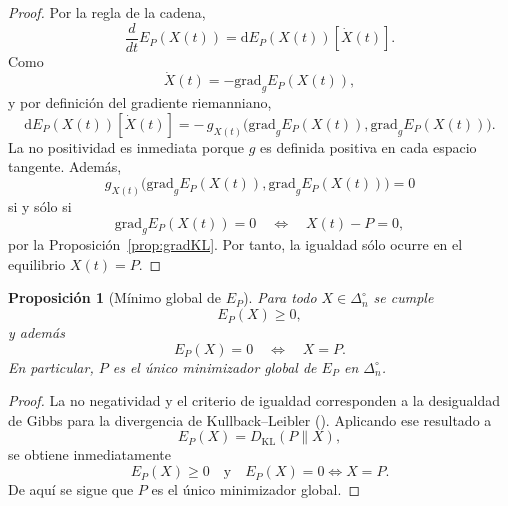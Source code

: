 \documentclass[12pt]{article}
\newtheorem{proposicion}{Proposición}[section]
\begin{document}
\begin{proof}
Por la regla de la cadena,
\[
\frac{d}{dt}E_P(X(t))
=
\mathrm dE_P(X(t))[\dot X(t)].
\]
Como
\[
\dot X(t)=-\mathrm{grad}_gE_P(X(t)),
\]
y por definición del gradiente riemanniano,
\[
\mathrm dE_P(X(t))[\dot X(t)]
=
-\,g_{X(t)}\!\bigl(\mathrm{grad}_gE_P(X(t)),\mathrm{grad}_gE_P(X(t))\bigr).
\]
La no positividad es inmediata porque $g$ es definida positiva en cada espacio tangente. Además,
\[
g_{X(t)}\!\bigl(\mathrm{grad}_gE_P(X(t)),\mathrm{grad}_gE_P(X(t))\bigr)=0
\]
si y sólo si
\[
\mathrm{grad}_gE_P(X(t))=0
\quad\Longleftrightarrow\quad
X(t)-P=0,
\]
por la Proposición~\ref{prop:gradKL}. Por tanto, la igualdad sólo ocurre en el equilibrio $X(t)=P$.
\end{proof}

\begin{proposicion}[Mínimo global de $E_P$]\label{prop:minimoGlobalKL}
Para todo $X\in\Delta_n^\circ$ se cumple
\[
E_P(X)\ge 0,
\]
y además
\[
E_P(X)=0
\quad\Longleftrightarrow\quad
X=P.
\]
En particular, $P$ es el único minimizador global de $E_P$ en $\Delta_n^\circ$.
\end{proposicion}

\begin{proof}
La no negatividad y el criterio de igualdad corresponden a la desigualdad de Gibbs para la divergencia de Kullback--Leibler (\cite{Csiszar1975,CoverThomas1991}). Aplicando ese resultado a
\[
E_P(X)=D_{\mathrm{KL}}(P\|X),
\]
se obtiene inmediatamente
\[
E_P(X)\ge 0
\quad\text{y}\quad
E_P(X)=0 \Longleftrightarrow X=P.
\]
De aquí se sigue que $P$ es el único minimizador global.
\end{proof}
\end{document}
